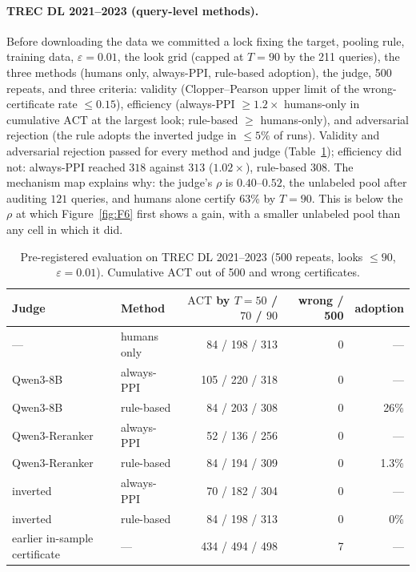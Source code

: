 \documentclass{article}
\newcommand{\eps}{\varepsilon}
\newcommand{\ACT}{\mathrm{ACT}}
\begin{document}
\paragraph{TREC DL 2021--2023 (query-level methods).} Before downloading the data we committed a lock fixing the target, pooling rule, training data, $\eps=0.01$, the look grid (capped at $T=90$ by the 211 queries), the three methods (humans only, always-PPI, rule-based adoption), the judge, 500 repeats, and three criteria: validity (Clopper--Pearson upper limit of the wrong-certificate rate $\le0.15$), efficiency (always-PPI $\ge1.2\times$ humans-only in cumulative $\ACT$ at the largest look; rule-based $\ge$ humans-only), and adversarial rejection (the rule adopts the inverted judge in $\le5\%$ of runs). Validity and adversarial rejection passed for every method and judge (Table~\ref{tab:prereg}); efficiency did not: always-PPI reached $318$ against $313$ ($1.02\times$), rule-based $308$. The mechanism map explains why: the judge's $\rho$ is $0.40$--$0.52$, the unlabeled pool after auditing $121$ queries, and humans alone certify 63\% by $T=90$. This is below the $\rho$ at which Figure~\ref{fig:F6} first shows a gain, with a smaller unlabeled pool than any cell in which it did.

\begin{table}[t]\centering\small
\caption{Pre-registered evaluation on TREC DL 2021--2023 (500 repeats, looks $\le90$, $\eps=0.01$). Cumulative $\ACT$ out of 500 and wrong certificates.}\label{tab:prereg}
\begin{tabular}{llrrr}\toprule
Judge & Method & $\ACT$ by $T{=}50$ / $70$ / $90$ & wrong / 500 & adoption\\\midrule
--- & humans only & 84 / 198 / 313 & 0 & ---\\
Qwen3-8B & always-PPI & 105 / 220 / 318 & 0 & ---\\
Qwen3-8B & rule-based & 84 / 203 / 308 & 0 & 26\%\\
Qwen3-Reranker & always-PPI & 52 / 136 / 256 & 0 & ---\\
Qwen3-Reranker & rule-based & 84 / 194 / 309 & 0 & 1.3\%\\
inverted & always-PPI & 70 / 182 / 304 & 0 & ---\\
inverted & rule-based & 84 / 198 / 313 & 0 & 0\%\\
earlier in-sample certificate & --- & 434 / 494 / 498 & 7 & ---\\\bottomrule
\end{tabular}
\end{table}
\end{document}
